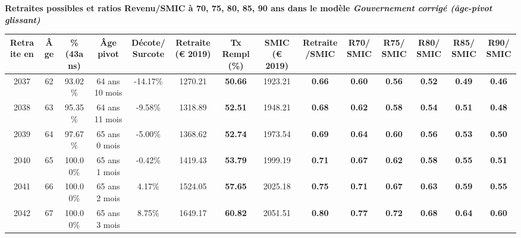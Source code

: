  \vspace{0.1cm} 
{\bf \noindent Retraites possibles et ratios Revenu/SMIC à 70, 75, 80, 85, 90 ans dans le modèle \emph{Gouvernement corrigé (âge-pivot glissant)}}  
 
\begin{adjustbox}{max width=\textwidth} 
\begin{tabular}[htb]{|c|c||c|c|c||c|c||c|c||c|c|c|c|c|} 
\hline 
 Retraite en &  Âge &  \%(43ans) &  Âge pivot &  Décote/Surcote &  Retraite (\euro{} 2019) &  Tx Rempl(\%) &  SMIC (\euro{} 2019) &  Retraite/SMIC &  R70/SMIC &  R75/SMIC &  R80/SMIC &  R85/SMIC &  R90/SMIC \\ 
\hline \hline 
 2037 &  62 &  93.02\% &  64 ans 10 mois &  -14.17\% &  1270.21 &  {\bf 50.66} &  1923.21 &  {\bf {\color{red} 0.66}} &  {\bf {\color{red} 0.60}} &  {\bf {\color{red} 0.56}} &  {\bf {\color{red} 0.52}} &  {\bf {\color{red} 0.49}} &  {\bf {\color{red} 0.46}} \\ 
\hline 
 2038 &  63 &  95.35\% &  64 ans 11 mois &  -9.58\% &  1318.89 &  {\bf 52.51} &  1948.21 &  {\bf {\color{red} 0.68}} &  {\bf {\color{red} 0.62}} &  {\bf {\color{red} 0.58}} &  {\bf {\color{red} 0.54}} &  {\bf {\color{red} 0.51}} &  {\bf {\color{red} 0.48}} \\ 
\hline 
 2039 &  64 &  97.67\% &  65 ans 0 mois &  -5.00\% &  1368.62 &  {\bf 52.74} &  1973.54 &  {\bf {\color{red} 0.69}} &  {\bf {\color{red} 0.64}} &  {\bf {\color{red} 0.60}} &  {\bf {\color{red} 0.56}} &  {\bf {\color{red} 0.53}} &  {\bf {\color{red} 0.50}} \\ 
\hline 
 2040 &  65 &  100.00\% &  65 ans 1 mois &  -0.42\% &  1419.43 &  {\bf 53.79} &  1999.19 &  {\bf {\color{red} 0.71}} &  {\bf {\color{red} 0.67}} &  {\bf {\color{red} 0.62}} &  {\bf {\color{red} 0.58}} &  {\bf {\color{red} 0.55}} &  {\bf {\color{red} 0.51}} \\ 
\hline 
 2041 &  66 &  100.00\% &  65 ans 2 mois &  4.17\% &  1524.05 &  {\bf 57.65} &  2025.18 &  {\bf {\color{red} 0.75}} &  {\bf {\color{red} 0.71}} &  {\bf {\color{red} 0.67}} &  {\bf {\color{red} 0.63}} &  {\bf {\color{red} 0.59}} &  {\bf {\color{red} 0.55}} \\ 
\hline 
 2042 &  67 &  100.00\% &  65 ans 3 mois &  8.75\% &  1649.17 &  {\bf 60.82} &  2051.51 &  {\bf {\color{red} 0.80}} &  {\bf {\color{red} 0.77}} &  {\bf {\color{red} 0.72}} &  {\bf {\color{red} 0.68}} &  {\bf {\color{red} 0.64}} &  {\bf {\color{red} 0.60}} \\ 
\hline 
\hline 
\end{tabular} 
\end{adjustbox} 
 
